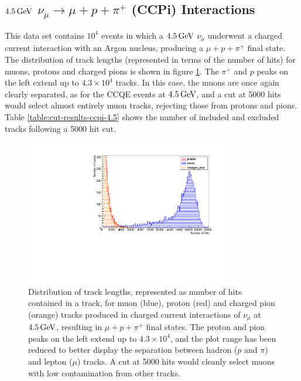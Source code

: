 \subsection{$4.5\GeV$ $\nu_\mu \rightarrow \mu + p + \pi^+$ (CCPi) Interactions}
This data set contains $10^4$ events in which a $4.5\GeV$ $\nu_\mu$ underwent a charged current interaction with an Argon nucleus, producing a $\mu + p + \pi^+$ final state. The distribution of track lengths (represented in terms of the number of hits) for muons, protons and charged pions is shown in figure \ref{fig:ccpi-track-lengths-4500MeV}. The $\pi^+$ and $p$ peaks on the left extend up to $4.3\times10^4$ tracks. In this case, the muons are once again clearly separated, as for the CCQE events at $4.5\GeV$, and a cut at 5000 hits would select almost entirely muon tracks, rejecting those from protons and pions. Table \ref{table:cut-results-ccpi-4.5} shows the number of included and excluded tracks following a 5000 hit cut.

\begin{figure}
\centering
\includegraphics[angle=-90,width=0.8\textwidth]{chapters/particleid_images/tracks-ccpi-4500MeV}
\caption[Track length distribution for $\mu$, $p$ and $\pi^+$ from $4.5\GeV$ neutrinos (CCPi)]{\label{fig:ccpi-track-lengths-4500MeV}Distribution of track lengths, represented as number of hits contained in a track, for muon (blue), proton (red) and charged pion (orange) tracks produced in charged current interactions of $\nu_\mu$ at $4.5\GeV$, resulting in $\mu + p + \pi^+$ final states. The proton and pion peaks on the left extend up to $4.3\times10^4$, and the plot range has been reduced to better display the separation between hadron ($p$ and $\pi$) and lepton ($\mu$) tracks. A cut at 5000 hits would cleanly select muons with low contamination from other tracks.}
\end{figure}

